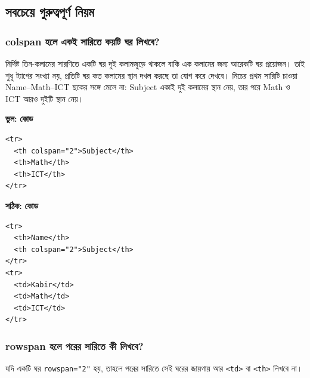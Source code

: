 \subsection{সবচেয়ে গুরুত্বপূর্ণ নিয়ম}

\subsubsection{colspan হলে একই সারিতে কয়টি ঘর লিখবে?}

নির্দিষ্ট তিন-কলামের সারণিতে একটি ঘর দুই কলামজুড়ে থাকলে বাকি এক কলামের জন্য আরেকটি ঘর প্রয়োজন। তাই শুধু ট্যাগের সংখ্যা নয়, প্রতিটি ঘর কত কলামের স্থান দখল করছে তা যোগ করে দেখবে। নিচের প্রথম সারিটি চাওয়া Name--Math--ICT ছকের সঙ্গে মেলে না: Subject একাই দুই কলামের স্থান নেয়, তার পরে Math ও ICT আরও দুইটি স্থান নেয়।

\par\noindent
\begin{minipage}[t]{.50\linewidth}\vspace{0pt}\small
\textbf{ভুল:}
\textbf{\color{chFourTeal}কোড}\par
\begin{verbatim}
<tr>
  <th colspan="2">Subject</th>
  <th>Math</th>
  <th>ICT</th>
</tr>
\end{verbatim}
\par\smallskip
\end{minipage}\hfill
\begin{minipage}[t]{.46\linewidth}\vspace{0pt}\small
\textbf{সঠিক:}
\textbf{\color{chFourTeal}কোড}\par
\begin{verbatim}
<tr>
  <th>Name</th>
  <th colspan="2">Subject</th>
</tr>
<tr>
  <td>Kabir</td>
  <td>Math</td>
  <td>ICT</td>
</tr>
\end{verbatim}
\par\smallskip
\end{minipage}\par


\subsubsection{rowspan হলে পরের সারিতে কী লিখবে?}

যদি একটি ঘর \texttt{rowspan="2"} হয়, তাহলে পরের সারিতে সেই ঘরের জায়গায় আর \texttt{<td>} বা \texttt{<th>} লিখবে না।

